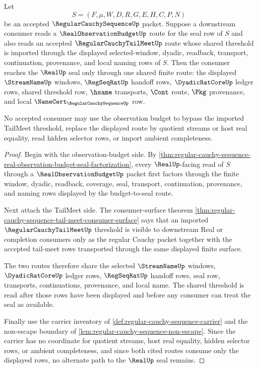\begin{theorem}
\label{thm:regular-cauchy-sequence-observation-budget-tail-meet-consumer}
Let
$$
S=(F,\mu,W,D,R,G,E,H,C,P,N)
$$
be an accepted $\RegularCauchySequenceUp$ packet. Suppose a downstream consumer reads a $\RealObservationBudgetUp$ route for the seal row of $S$ and also reads an accepted $\RegularCauchyTailMeetUp$ route whose shared threshold is imported through the displayed selected-window, dyadic, readback, transport, continuation, provenance, and local naming rows of $S$. Then the consumer reaches the $\RealUp$ seal only through one shared finite route: the displayed $\StreamNameUp$ windows, $\RegSeqRatUp$ handoff rows, $\DyadicRatCoreUp$ ledger rows, shared threshold row, $\hsame$ transports, $\Cont$ route, $\Pkg$ provenance, and local $\NameCert_{\RegularCauchySequenceUp}$ row.

No accepted consumer may use the observation budget to bypass the imported TailMeet threshold, replace the displayed route by quotient streams or host real equality, read hidden selector rows, or import ambient completeness.
\end{theorem}
\begin{proof}
Begin with the observation-budget side. By \autoref{thm:regular-cauchy-sequence-real-observation-budget-seal-factorization}, every $\RealUp$-facing read of $S$ through a $\RealObservationBudgetUp$ packet first factors through the finite window, dyadic, readback, coverage, seal, transport, continuation, provenance, and naming rows displayed by the budget-to-seal route.

Next attach the TailMeet side. The consumer-surface theorem \autoref{thm:regular-cauchy-sequence-tail-meet-consumer-surface} says that an imported $\RegularCauchyTailMeetUp$ threshold is visible to downstream Real or completion consumers only as the regular Cauchy packet together with the accepted tail-meet rows transported through the same displayed finite surface.

The two routes therefore share the selected $\StreamNameUp$ windows, $\DyadicRatCoreUp$ ledger rows, $\RegSeqRatUp$ handoff rows, seal row, transports, continuations, provenance, and local name. The shared threshold is read after those rows have been displayed and before any consumer can treat the seal as available.

Finally use the carrier inventory of \autoref{def:regular-cauchy-sequence-carrier} and the non-escape boundary of \autoref{lem:regular-cauchy-sequence-non-escape}. Since the carrier has no coordinate for quotient streams, host real equality, hidden selector rows, or ambient completeness, and since both cited routes consume only the displayed rows, no alternate path to the $\RealUp$ seal remains.
\end{proof}

